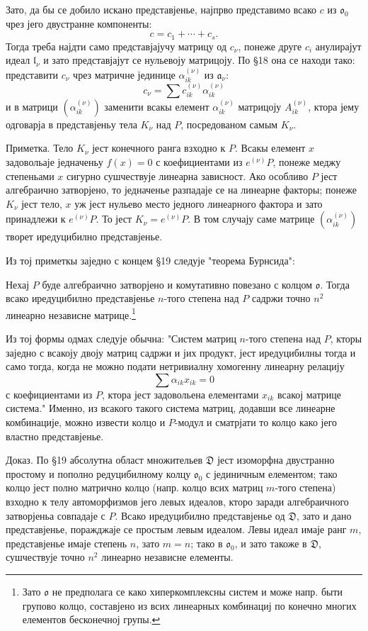 ﻿\documentclass[11pt]{article}
\providecommand{\mo}{\mathfrak{o}}
\providecommand{\ma}{\mathfrak{a}}
\providecommand{\ml}{\mathfrak{l}}
\providecommand{\mD}{\mathfrak{D}}
\begin{document}
Зато, да бы се добило искано представјенье, најпрво представимо всако $c$ из $\mo_0$ чрез јего двустранне компоненты:
\[
        c=c_1+\cdots+c_s.
\]
Тогда треба најдти само представјајучу матрицу од $c_\nu$, понеже друге $c_i$ анулирајут идеал $\ml_\nu$ и зато представјајут се нульевоју матрицоју. По §18 она се находи тако: представити $c_\nu$ чрез матричне јединице $\alpha_{ik}^{(\nu)}$ из $\ma_\nu$:
\[
        c_\nu=\sum c_{ik}^{(\nu)}\alpha_{ik}^{(\nu)}
\]
и в матрици $(\alpha_{ik}^{(\nu)})$ заменити всакы елемент $\alpha_{ik}^{(\nu)}$ матрицоју $A_{ik}^{(\nu)}$, ктора јему одговарја в представјеньу тела $K_\nu$ над $P$, посредованом самым $K_\nu$.

Приметка. Тело $K_\nu$ јест конечного ранга взходно к $P$. Всакы елемент $x$ задовольаје једначеньу $f(x)=0$ с коефициентами из $e^{(\nu)}P$, понеже меджу степеньами $x$ сигурно сушчествује линеарна зависност. Ако особливо $P$ јест алгебраично затворјено, то једначенье разпадаје се на линеарне факторы; понеже $K_\nu$ јест тело, $x$ уж јест нульево место једного линеарного фактора и зато принадлежи к $e^{(\nu)}P$. То јест $K_\nu=e^{(\nu)}P$. В том случају саме матрице $(\alpha_{ik}^{(\nu)})$ творет иредуцибилно представјенье.

Из тој приметкы заједно с концем §19 следује "теорема Бурнсида":

Нехај $P$ буде алгебраично затворјено и комутативно повезано с колцом $\mo$. Тогда всако иредуцибилно представјенье $n$-того степена над $P$ садржи точно $n^2$ линеарно независне матрице.\footnote{Зато $\mo$ не предполага се како хиперкомплексны систем и може напр. быти групово колцо, составјено из всих линеарных комбинациј по конечно многих елементов бесконечној групы.}

Из тој формы одмах следује обычна: "Систем матриц $n$-того степена над $P$, кторы заједно с всакоју двоју матриц садржи и јих продукт, јест иредуцибилны тогда и само тогда, когда не можно подати нетривиалну хомогенну линеарну релацију
\[
        \sum \alpha_{ik}x_{ik}=0
\]
с коефициентами из $P$, ктора јест задовольена елементами $x_{ik}$ всакој матрице система." Именно, из всакого такого система матриц, додавши все линеарне комбинације, можно извести колцо и $P$-модул и сматрјати то колцо како јего властно представјенье.

Доказ. По §19 абсолутна област множительев $\mD$ јест изоморфна двустранно простому и пополно редуцибилному колцу $\mo_0$ с јединичным елементом; тако колцо јест полно матрично колцо (напр. колцо всих матриц $m$-того степена) взходно к телу автоморфизмов јего левых идеалов, кторо заради алгебраичного затворјеньа совпадаје с $P$. Всако иредуцибилно представјенье од $\mD$, зато и дано представјенье, поражджаје се простым левым идеалом. Левы идеал имаје ранг $m$, представјенье имаје степень $n$, зато $m=n$; тако в $\mo_0$, и зато такоже в $\mD$, сушчествује точно $n^2$ линеарно независне елементы.
\end{document}
